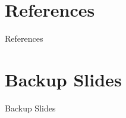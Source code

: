 \documentclass[aspectratio=169]{beamer}                    %
\begin{document}
\section{References}
\begin{frame}{References}
	\printbibliography
\end{frame}

\appendix %
\section*{Backup Slides}
\begin{frame}
	\centering
	\vfill
	{\fontsize{40}{50}\selectfont Backup Slides}
	\vfill
\end{frame}

\end{document}
